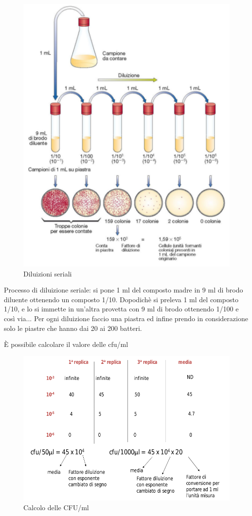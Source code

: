 \documentclass[11pt]{book}
\begin{document}
\begin{itemize}
\begin{enumerate}
\begin{figure}[htp]
\centering
\includegraphics[scale=0.4]{img/Diluizioni seriali.png}
\caption{Diluizioni seriali}
\label{}
\end{figure}

\clearpage
Processo di diluizione seriale: si pone 1 ml del composto madre in 9 ml di brodo diluente ottenendo un composto 1/10. Dopodichè si preleva 1 ml del composto 1/10, e lo si immette in un’altra provetta con 9 ml di brodo ottenendo 1/100 e così via...
Per ogni diluizione faccio una piastra ed infine prendo in considerazione solo le piastre che hanno dai 20 ai 200 batteri.

\`E possibile calcolare il valore delle cfu/ml

\begin{figure}[htp]
\centering
\includegraphics[scale=0.4]{img/Calcolo cfu-ml.png}
\caption{Calcolo delle CFU/ml}
\label{}
\end{figure}


\end{enumerate}
\end{itemize}
\end{document}
